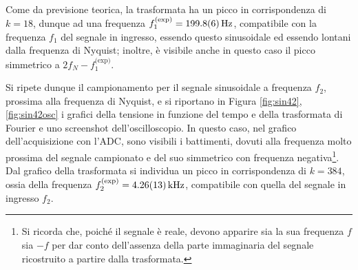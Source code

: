 \documentclass[10pt,oneside,a4paper]{article}
\begin{document}
\begin{multicols}{2}
Come da previsione teorica, la trasformata ha un picco in corrispondenza di $k=18$, dunque ad una frequenza $f_1^\text{(exp)} = \SI{199.8 \pm 0.6}{\Hz}$, compatibile con la frequenza $f_1$ del segnale in ingresso, essendo questo sinusoidale ed essendo lontani dalla frequenza di Nyquist; inoltre, è visibile anche in questo caso il picco simmetrico a $2f_N - f_1^\text{(exp)}$.

Si ripete dunque il campionamento per il segnale sinusoidale a frequenza $f_2$, prossima alla frequenza di Nyquist, e si riportano in Figura \ref{fig:sin42}, \ref{fig:sin42osc} i grafici della tensione in funzione del tempo e della trasformata di Fourier e uno screenshot dell'oscilloscopio. In questo caso, nel grafico dell'acquisizione con l'ADC, sono visibili i battimenti, dovuti alla frequenza molto prossima del segnale campionato e del suo simmetrico con frequenza negativa\footnote{Si ricorda che, poiché il segnale è reale, devono apparire sia la sua frequenza $f$ sia $-f$ per dar conto dell'assenza della parte immaginaria del segnale ricostruito a partire dalla trasformata.}. Dal grafico della trasformata si individua un picco in corrispondenza di $k = 384$, ossia della frequenza $f_2^\text{(exp)} = \SI{4.26 \pm 0.13}{\kilo\Hz}$, compatibile con quella del segnale in ingresso $f_2$.


\end{multicols}
\end{document}
